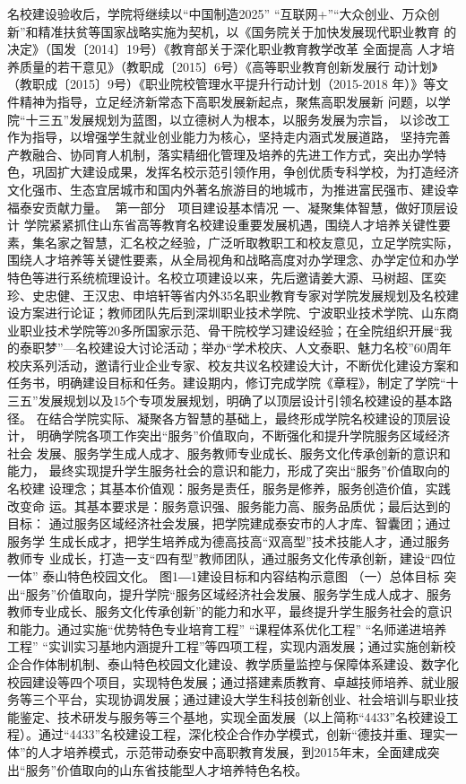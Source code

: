 名校建设验收后，学院将继续以“中国制造2025” “互联网+”“大众创业、万众创
新”和精准扶贫等国家战略实施为契机，以《国务院关于加快发展现代职业教育
的决定》（国发〔2014〕19号）《教育部关于深化职业教育教学改革 全面提高
人才培养质量的若干意见》（教职成〔2015〕6号）《高等职业教育创新发展行
动计划》（教职成〔2015〕9号）《职业院校管理水平提升行动计划（2015-2018
年）》等文件精神为指导，立足经济新常态下高职发展新起点，聚焦高职发展新
问题，以学院“十三五”发展规划为蓝图，以立德树人为根本，以服务发展为宗旨，
以诊改工作为指导，以增强学生就业创业能力为核心，坚持走内涵式发展道路，
坚持完善产教融合、协同育人机制，落实精细化管理及培养的先进工作方式，突出办学特色，巩固扩大建设成果，发挥名校示范引领作用，争创优质专科学校，为打造经济文化强市、生态宜居城市和国内外著名旅游目的地城市，为推进富民强市、建设幸福泰安贡献力量。
第一部分　项目建设基本情况
一、凝聚集体智慧，做好顶层设计
学院紧紧抓住山东省高等教育名校建设重要发展机遇，围绕人才培养关键性要素，集名家之智慧，汇名校之经验，广泛听取教职工和校友意见，立足学院实际，围绕人才培养等关键性要素，从全局视角和战略高度对办学理念、办学定位和办学特色等进行系统梳理设计。名校立项建设以来，先后邀请姜大源、马树超、匡奕珍、史忠健、王汉忠、申培轩等省内外35名职业教育专家对学院发展规划及名校建设方案进行论证；教师团队先后到深圳职业技术学院、宁波职业技术学院、山东商业职业技术学院等20多所国家示范、骨干院校学习建设经验；在全院组织开展“我的泰职梦”—名校建设大讨论活动；举办“学术校庆、人文泰职、魅力名校”60周年校庆系列活动，邀请行业企业专家、校友共议名校建设大计，不断优化建设方案和任务书，明确建设目标和任务。建设期内，修订完成学院《章程》，制定了学院“十三五”发展规划以及15个专项发展规划，明确了以顶层设计引领名校建设的基本路径。
在结合学院实际、凝聚各方智慧的基础上，最终形成学院名校建设的顶层设计，
明确学院各项工作突出“服务”价值取向，不断强化和提升学院服务区域经济社会
发展、服务学生成人成才、服务教师专业成长、服务文化传承创新的意识和能力，
最终实现提升学生服务社会的意识和能力，形成了突出“服务”价值取向的名校建
设理念；其基本价值观：服务是责任，服务是修养，服务创造价值，实践改变命
运。其基本要求是：服务意识强、服务能力高、服务品质优；最后达到的目标：
通过服务区域经济社会发展，把学院建成泰安市的人才库、智囊团；通过服务学
生成长成才，把学生培养成为德高技高“双高型”技术技能人才，通过服务教师专
业成长，打造一支“四有型”教师团队，通过服务文化传承创新，建设“四位一体”
泰山特色校园文化。
图1―1建设目标和内容结构示意图
（一）总体目标
突出“服务”价值取向，提升学院“服务区域经济社会发展、服务学生成人成才、服务教师专业成长、服务文化传承创新”的能力和水平，最终提升学生服务社会的意识和能力。通过实施“优势特色专业培育工程” “课程体系优化工程” “名师递进培养工程” “实训实习基地内涵提升工程”等四项工程，实现内涵发展；通过实施创新校企合作体制机制、泰山特色校园文化建设、教学质量监控与保障体系建设、数字化校园建设等四个项目，实现特色发展；通过搭建素质教育、卓越技师培养、就业服务等三个平台，实现协调发展；通过建设大学生科技创新创业、社会培训与职业技能鉴定、技术研发与服务等三个基地，实现全面发展（以上简称“4433”名校建设工程）。通过“4433”名校建设工程，深化校企合作办学模式，创新“德技并重、理实一体”的人才培养模式，示范带动泰安中高职教育发展，到2015年末，全面建成突出“服务”价值取向的山东省技能型人才培养特色名校。　　
